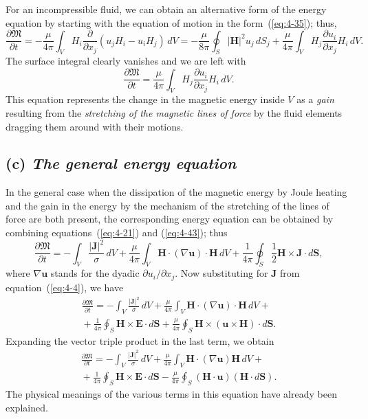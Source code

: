 For an incompressible fluid, we can obtain an alternative form of the energy equation by starting with the equation of motion in the form~(\ref{eq:4-35}); thus,
\begin{equation}
\label{eq:4-42}
\frac{\partial\mathfrak{M}}{\partial t} = -\frac{\mu}{4\pi}\int_V H_i\frac{\partial}{\partial x_j}(u_j H_i - u_i H_j)\,dV = -\frac{\mu}{8\pi}\oint_S |\mathbf{H}|^2 u_j\,dS_j + \frac{\mu}{4\pi}\int_V H_j\frac{\partial u_i}{\partial x_j}H_i\,dV.
\end{equation}
The surface integral clearly vanishes and we are left with
\begin{equation}
\label{eq:4-43}
\frac{\partial\mathfrak{M}}{\partial t} = \frac{\mu}{4\pi}\int_V H_j\frac{\partial u_i}{\partial x_j}H_i\,dV.
\end{equation}
This equation represents the change in the magnetic energy inside $V$ as a \emph{gain} resulting from the \emph{stretching of the magnetic lines of force} by the fluid elements dragging them around with their motions.

\subsection*{(c) \emph{The general energy equation}}

In the general case when the dissipation of the magnetic energy by Joule heating and the gain in the energy by the mechanism of the stretching of the lines of force are both present, the corresponding energy equation can be obtained by combining equations~(\ref{eq:4-21}) and (\ref{eq:4-43}); thus
\begin{equation}
\label{eq:4-44}
\frac{\partial\mathfrak{M}}{\partial t} = -\int_V \frac{|\mathbf{J}|^2}{\sigma}\,dV + \frac{\mu}{4\pi}\int_V \mathbf{H}\cdot(\nabla\mathbf{u})\cdot\mathbf{H}\,dV + \frac{1}{4\pi}\oint_S \frac{1}{2}\mathbf{H}\times\mathbf{J}\cdot d\mathbf{S},
\end{equation}
where $\nabla\mathbf{u}$ stands for the dyadic $\partial u_i/\partial x_j$. Now substituting for $\mathbf{J}$ from equation~(\ref{eq:4-4}), we have
\begin{multline}
\label{eq:4-45}
\frac{\partial\mathfrak{M}}{\partial t} = -\int_V \frac{|\mathbf{J}|^2}{\sigma}\,dV + \frac{\mu}{4\pi}\int_V \mathbf{H}\cdot(\nabla\mathbf{u})\cdot\mathbf{H}\,dV + {} \\
{} + \frac{1}{4\pi}\oint_S \mathbf{H}\times\mathbf{E}\cdot d\mathbf{S} + \frac{\mu}{4\pi}\oint_S \mathbf{H}\times(\mathbf{u}\times\mathbf{H})\cdot d\mathbf{S}.
\end{multline}
Expanding the vector triple product in the last term, we obtain
\begin{multline}
\label{eq:4-46}
\frac{\partial\mathfrak{M}}{\partial t} = -\int_V \frac{|\mathbf{J}|^2}{\sigma}\,dV + \frac{\mu}{4\pi}\int_V \mathbf{H}\cdot(\nabla\mathbf{u})\mathbf{H}\,dV + {} \\
{} + \frac{1}{4\pi}\oint_S \mathbf{H}\times\mathbf{E}\cdot d\mathbf{S} - \frac{\mu}{4\pi}\oint_S (\mathbf{H}\cdot\mathbf{u})(\mathbf{H}\cdot d\mathbf{S}).
\end{multline}
The physical meanings of the various terms in this equation have already been explained.

